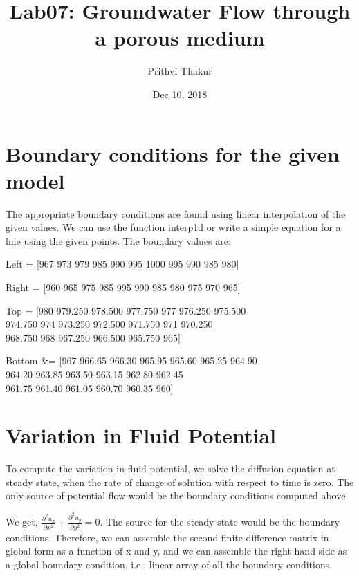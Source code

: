 \documentclass{article}
\title{Lab07: Groundwater Flow through a porous medium}
\author{Prithvi Thakur}
\date{Dec 10, 2018}
\begin{document}
\maketitle

\section{Boundary conditions for the given model}
The appropriate boundary conditions are found using linear interpolation of the given values. We can use the function interp1d or write a simple equation for a line using the given points. The boundary values are:

Left = [967 973 979 985 990 995 1000 995 990 985 980] 

Right = [960 965 975 985 995 990 985 980 975 970 965] 

Top = [980 979.250 978.500 977.750 977 976.250 975.500 \\ 
      974.750 974 973.250 972.500 971.750 971 970.250 \\
      \tab {} 968.750 968 967.250 966.500 965.750 965]     

Bottom &= [967 966.65 966.30 965.95 965.60 965.25 964.90 \\
          \tab {} 964.20 963.85 963.50 963.15 962.80 962.45 \\ 
          \tab {} 961.75 961.40 961.05 960.70 960.35 960] 

\newpage
\section{Variation in Fluid Potential}
To compute the variation in fluid potential, we solve the diffusion equation at steady state, when the rate of change of solution with respect to time is zero. The only source of potential flow would be the boundary conditions computed above.

We get, $\frac{\partial^2u_x}{\partial x^2} + \frac{\partial^2u_y}{\partial y^2}= 0$. The source for the steady state would be the boundary conditions. Therefore, we can assemble the second finite difference matrix in global form as a function of x and y, and we can assemble the right hand side as a global boundary condition, i.e., linear array of all the boundary conditions. 
\end{document}
